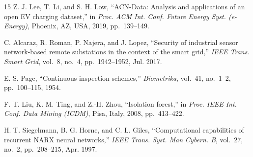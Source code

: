 \documentclass[journal]{IEEEtran}
\begin{document}
\begin{thebibliography}{15}
Z. J. Lee, T. Li, and S. H. Low,
``ACN-Data: Analysis and applications of an open EV charging dataset,''
in \emph{Proc. ACM Int. Conf. Future Energy Syst. (e-Energy)},
Phoenix, AZ, USA, 2019, pp.~139--149.

C. Alcaraz, R. Roman, P. Najera, and J. Lopez,
``Security of industrial sensor network-based remote substations in the
context of the smart grid,''
\emph{IEEE Trans. Smart Grid}, vol.~8, no.~4, pp.~1942--1952, Jul. 2017.

E. S. Page,
``Continuous inspection schemes,''
\emph{Biometrika}, vol.~41, no.~1--2, pp.~100--115, 1954.

F. T. Liu, K. M. Ting, and Z.-H. Zhou,
``Isolation forest,''
in \emph{Proc. IEEE Int. Conf. Data Mining (ICDM)}, Pisa, Italy,
2008, pp.~413--422.

H. T. Siegelmann, B. G. Horne, and C. L. Giles,
``Computational capabilities of recurrent NARX neural networks,''
\emph{IEEE Trans. Syst. Man Cybern. B}, vol.~27, no.~2,
pp.~208--215, Apr. 1997.

\end{thebibliography}
\end{document}
